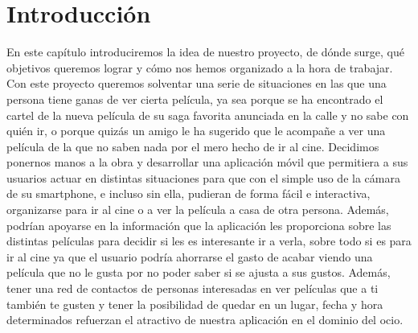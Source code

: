 
\cleardoublepage


\chapter{Introducción}
\label{makereference}


    En este capítulo introduciremos la idea de nuestro proyecto, de dónde surge, qué objetivos queremos lograr y cómo nos hemos organizado a la hora de trabajar.
    Con este proyecto queremos solventar una serie de situaciones en las que una persona
    tiene ganas de ver cierta película, ya sea porque se ha encontrado el cartel de la nueva película
    de su saga favorita anunciada en la calle y no sabe con quién ir, o porque quizás un amigo le ha sugerido que le acompañe
    a ver una película de la que no saben nada por el mero hecho de ir al cine. 
    Decidimos ponernos manos a la obra y desarrollar una aplicación móvil que permitiera a sus usuarios actuar en distintas situaciones
    para que con el simple uso de la cámara de su smartphone, e incluso sin ella, pudieran de forma
    fácil e interactiva, organizarse para ir al cine o a ver la película a casa de otra persona. Además, podrían apoyarse en la 
    información que la aplicación les proporciona sobre las distintas películas para decidir si les es interesante ir a verla, sobre todo 
    si es para ir al cine ya que el usuario podría ahorrarse el gasto de acabar viendo una película que no le gusta por no poder saber si se 
    ajusta a sus gustos. Además, tener una red de contactos de personas interesadas en ver películas que a ti también te gusten y tener la posibilidad
    de quedar en un lugar, fecha y hora determinados refuerzan el atractivo de nuestra aplicación en el dominio del ocio.



